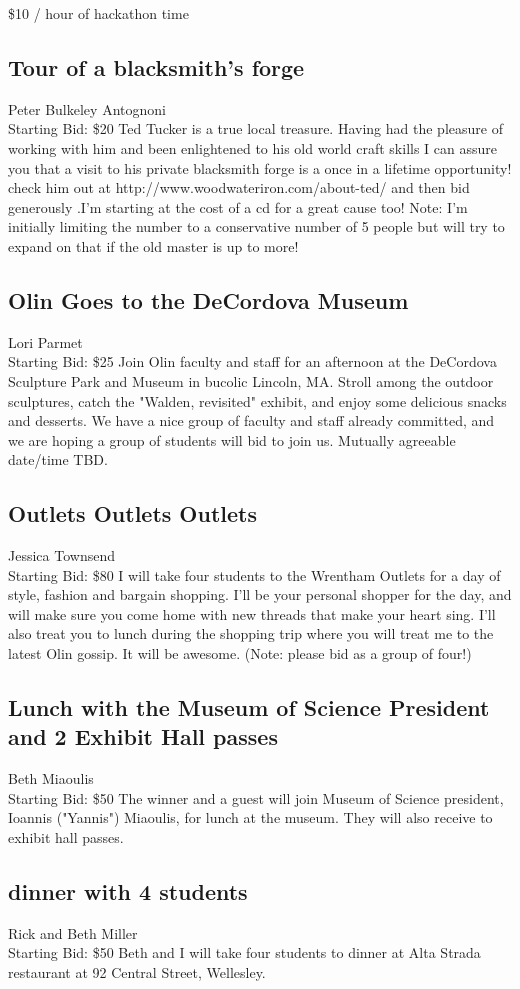 \documentclass[11pt]{article}
\begin{document}
\$10 / hour of hackathon time
\subsection{Tour of a blacksmith's forge}
Peter Bulkeley Antognoni
\\
Starting Bid: \$20
\newline
Ted Tucker is a true local treasure. Having had the pleasure of working with him and been enlightened to his old world craft skills I can assure you that a visit to his private blacksmith forge is a once in a lifetime opportunity! check him out at http://www.woodwateriron.com/about-ted/
and then bid generously .I'm starting at the cost of a cd for a great cause too!
Note: I'm initially limiting the number to a conservative number of 5 people but will try to expand on that if the old master is up to more!
\subsection{Olin Goes to the DeCordova Museum}
Lori Parmet
\\
Starting Bid: \$25
\newline
Join Olin faculty and staff for an afternoon at the DeCordova Sculpture Park and Museum in bucolic Lincoln, MA. Stroll among the outdoor sculptures, catch the "Walden, revisited" exhibit, and enjoy some delicious snacks and desserts. We have a nice group of faculty and staff already committed, and we are hoping a group of students will bid to join us. Mutually agreeable date/time TBD.
\subsection{Outlets Outlets Outlets}
Jessica Townsend
\\
Starting Bid: \$80
\newline
I will take four students to the Wrentham Outlets for a day of style, fashion and bargain shopping. I'll be your personal shopper for the day, and will make sure you come home with new threads that make your heart sing. I'll also treat you to lunch during the shopping trip where you will treat me to the latest Olin gossip. It will be awesome. (Note: please bid as a group of four!)
\subsection{Lunch with the Museum of Science President and 2 Exhibit Hall passes}
Beth Miaoulis
\\
Starting Bid: \$50
\newline
The winner and a guest will join Museum of Science president, Ioannis ("Yannis") Miaoulis, for lunch at the museum.  They will also receive to exhibit hall passes.
\subsection{dinner with 4 students}
Rick and Beth Miller
\\
Starting Bid: \$50
\newline
Beth and I will take four students to dinner at Alta Strada restaurant at 92 Central Street, Wellesley.
\end{document}
